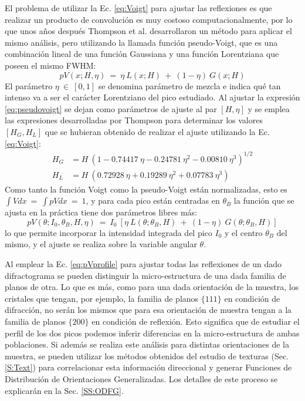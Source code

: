 El problema de utilizar la Ec. \ref{eq:Voigt} para ajustar las reflexiones es que realizar un producto de convolución es muy costoso computacionalmente, por lo que unos años después Thompson et al.\cite{Thompson1987} desarrollaron un método para aplicar el mismo análisis, pero utilizando la llamada función pseudo-Voigt, que es una combinación lineal de una función Gaussiana y una función Lorentziana que poseen el mismo FWHM:
\begin{equation}
  pV(x; H, \eta) \ = \ \eta \ L(x; H) \ + \ (1 - \eta) \ G(x; H)
  \label{eq:pseudovoigt}
\end{equation}
\noindent
El parámetro $\eta \ \in \ [0,1]$ se denomina parámetro de mezcla e indica qué tan intenso va a ser el carácter Lorentziano del pico estudiado. 
Al ajustar la expresión \ref{eq:pseudovoigt} se dejan como parámetros de ajuste al par $[H, \eta]$ y se emplea las expresiones desarrolladas por Thompson para determinar los valores $[H_G, H_L]$ que se hubieran obtenido de realizar el ajuste utilizando la Ec. \ref{eq:Voigt}:
\begin{align}
  H_G & =  H \ (1 -  0.74417 \ \eta - 0.24781 \ \eta^2 - 0.00810 \ \eta^3)^{1/2} \nonumber \\
  H_L & =  H \ (0.72928 \ \eta + 0.19289 \ \eta^2 + 0.07783 \ \eta^3)
  \label{eq:Hg}
\end{align}
\noindent
Como tanto la función Voigt como la pseudo-Voigt están normalizadas, esto es $\int V dx \ = \ \int pV dx \ = \ 1$, y para cada pico están centradas en $\theta_B$ la función que se ajusta en la práctica tiene dos parámetros libres más:
\begin{equation}
    pV(\theta; I_0, \theta_B, H, \eta) \ = \ I_0 \ [\eta \ L(\theta; \theta_B, H) \ + \ (1 - \eta) \ G(\theta; \theta_B, H)]
  \label{eq:pVprofile}
\end{equation}
\noindent
lo que permite incorporar la intensidad integrada del pico $I_0$ y el centro $\theta_B$ del mismo, y el ajuste se realiza sobre la variable angular $\theta$.

Al emplear la Ec. \ref{eq:pVprofile} para ajustar todas las reflexiones de un dado difractograma se pueden distinguir la micro-estructura de una dada familia de planos de otra.
Lo que es más, como para una dada orientación de la muestra, los cristales que tengan, por ejemplo, la familia de planos $\{111\}$ en condición de difracción, no serán los mismos que para esa orientación de muestra tengan a la familia de planos $\{200\}$ en condición de reflexión.
Esto significa que de estudiar el perfil de los dos picos podemos inferir diferencias en la micro-estructura de ambas poblaciones.
Si además se realiza este análisis para distintas orientaciones de la muestra, se pueden utilizar los métodos obtenidos del estudio de texturas (Sec. \ref{S:Text}) para correlacionar esta información direccional y generar Funciones de Distribución de Orientaciones Generalizadas.
Los detalles de este proceso se explicarán en la Sec. \ref{SS:ODFG}.

